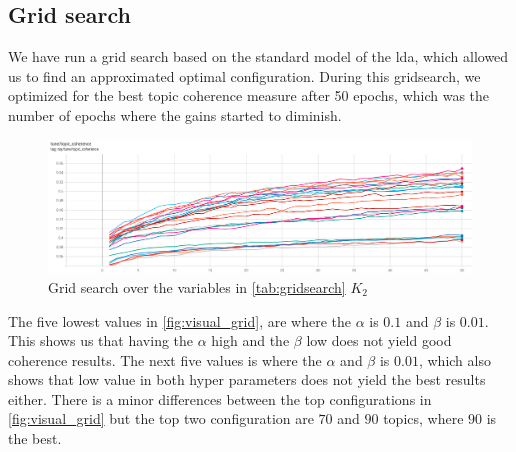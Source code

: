\subsection{Grid search}
We have run a grid search based on the standard model of the \gls{lda}, which allowed us to find an approximated optimal configuration.
During this gridsearch, we optimized for the best topic coherence measure after 50 epochs, which was the number of epochs where the gains started to diminish.
\begin{figure}
	\includegraphics[width=\textwidth]{figures/gridsearch.png}
	\caption{Grid search over the variables in \autoref{tab:gridsearch} $K_2$}
	\label{fig:visual_grid}
\end{figure} 
The five lowest values in \autoref{fig:visual_grid}, are where the $\alpha$ is $0.1$ and $\beta$ is $0.01$. 
This shows us that having the $\alpha$ high and the $\beta$ low does not yield good coherence results.
The next five values is where the $\alpha$ and $\beta$ is $0.01$, which also shows that low value in both hyper parameters does not yield the best results either.
There is a minor differences between the top configurations in \autoref{fig:visual_grid} but the top two configuration are $70$ and $90$ topics, where $90$ is the best.